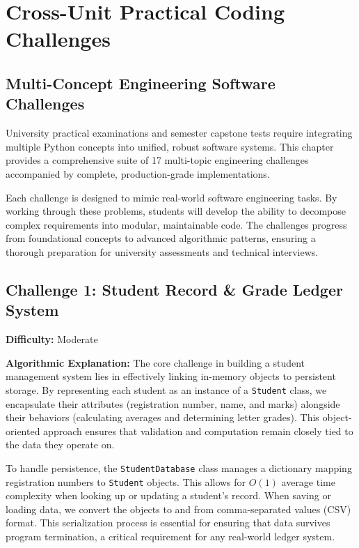 \chapter{Cross-Unit Practical Coding Challenges}
\label{chap:practical-coding-challenges}

\section{Multi-Concept Engineering Software Challenges}

University practical examinations and semester capstone tests require integrating multiple Python concepts into unified, robust software systems. This chapter provides a comprehensive suite of 17 multi-topic engineering challenges accompanied by complete, production-grade implementations.

Each challenge is designed to mimic real-world software engineering tasks. By working through these problems, students will develop the ability to decompose complex requirements into modular, maintainable code. The challenges progress from foundational concepts to advanced algorithmic patterns, ensuring a thorough preparation for university assessments and technical interviews.

\section{Challenge 1: Student Record \& Grade Ledger System}

\textbf{Difficulty:} Moderate

\textbf{Algorithmic Explanation:}
The core challenge in building a student management system lies in effectively linking in-memory objects to persistent storage. By representing each student as an instance of a \texttt{Student} class, we encapsulate their attributes (registration number, name, and marks) alongside their behaviors (calculating averages and determining letter grades). This object-oriented approach ensures that validation and computation remain closely tied to the data they operate on.

To handle persistence, the \texttt{StudentDatabase} class manages a dictionary mapping registration numbers to \texttt{Student} objects. This allows for $O(1)$ average time complexity when looking up or updating a student's record. When saving or loading data, we convert the objects to and from comma-separated values (CSV) format. This serialization process is essential for ensuring that data survives program termination, a critical requirement for any real-world ledger system.

